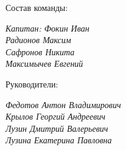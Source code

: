 
\large Состав команды:

\begin{flushleft}
	\emph{Капитан: Фокин Иван} \\
	\emph{Радионов Максим} \\
	\emph{Сафронов Никита} \\
	\emph{Максимычев Евгений}
\end{flushleft}

\large Руководители:

\begin{flushleft}
	\emph{Федотов Антон Владимирович} \\
	\emph{Крылов Георгий Андреевич} \\
	\emph{Лузин Дмитрий Валерьевич} \\
	\emph{Лузина Екатерина Павловна}
\end{flushleft} 
  
\newpage
